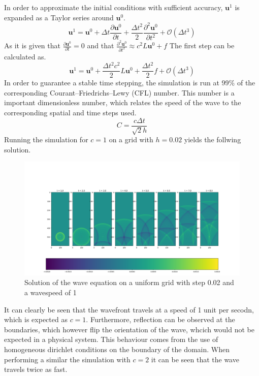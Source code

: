 \documentclass{article}
\begin{document}
In order to approximate the initial conditions with sufficient accuracy, $\mathbf{u}^{1}$ is expanded as a Taylor series around $\mathbf{u}^{0}$.
\begin{equation}
\mathbf{u}^{1}=\mathbf{u}^{0}+\Delta t \frac{\partial \mathbf{u}^{0}}{\partial t} + \frac{\Delta t^2}{2} \frac{\partial^2 \mathbf{u}^{0}}{\partial t^2} + \mathcal{O}(\Delta t^3)
\end{equation}
As it is given that $\frac{\partial \mathbf{u}^{0}}{\partial t} = 0$ and that $\frac{\partial^2 \mathbf{u}^{0}}{\partial t^2} \approx c^2 L \mathbf{u}^0 + f$ The first step can be calculated as.
\begin{equation}
\mathbf{u}^{1}=\mathbf{u}^{0}+ \frac{\Delta t^2 c^2}{2} L \mathbf{u}^{0} + \frac{\Delta t^2 }{2} f+ \mathcal{O}(\Delta t^3) 
\end{equation}
In order to guarantee a stable time stepping, the simulation is run at 99\% of the corresponding Courant–Friedrichs–Lewy (CFL) number. This number is a important dimensionless number, which relates the speed of the wave to the corresponding spatial and time steps used.
\begin{equation}
C = \frac{c\Delta t}{\sqrt{2}h}
\end{equation}
Running the simulation for $c=1$ on a grid with $h=0.02$ yields the follwing solution.

\begin{figure}[H]
	\centering
	\includegraphics[width=.9\linewidth]{311.png}
	\caption{Solution of the wave equation on a uniform grid with step 0.02 and a wavespeed of 1}
\end{figure}
It can clearly be seen that the wavefront travels at a speed of 1 unit per secodn, which is expected as $c=1$. Furthermore, reflection can be observed at the boundaries, which however flip the orientation of the wave, whcich would not be expected in a physical system. This behaviour comes from the use of homogeneous dirichlet conditions on the boundary of the domain. When performing a similar the simulation with $c=2$ it can be seen that the wave travels twice as fast.
\end{document}
